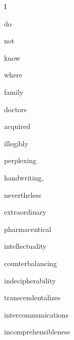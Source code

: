 


  I

  do

  not

  know

  where

  family

  doctors

  acquired

  illegibly

  perplexing

  handwriting,

  nevertheless

  extraordinary

  pharmacentical

  intellectuality

  counterbalancing

  indecipherability

  transcendentalizes

  intercommunications

  incomprehensibleness
